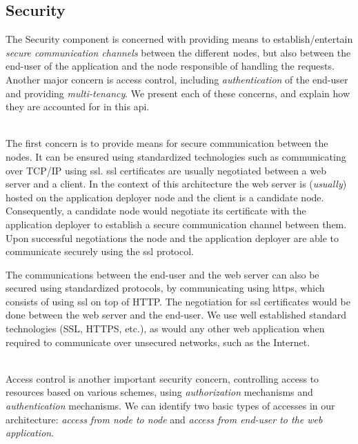 \documentclass[12pt, titlepage]{uo_temp}
\begin{document}
     \subsection{Security}
     The Security component is concerned with providing means to establish/entertain
     \emph{secure communication channels} between the different nodes, but also between
     the end-user of the application and the node responsible of handling the
     requests. Another major concern is access control, including \emph{authentication} of
     the end-user and providing \emph{multi-tenancy}. We present each of these concerns,
     and explain how they are accounted for in this \gls{api}.
     
     \\ The first concern is to provide means for secure communication between the
     nodes. It can be ensured using standardized technologies such as communicating over
     TCP/IP using \gls{ssl}. \gls{ssl} certificates are usually negotiated between a web
     server and a client. In the context of this architecture the web server is
     (\emph{usually}) hosted on the application deployer node and the client is a
     candidate node. Consequently, a candidate node would negotiate its certificate with
     the application deployer to establish a secure communication channel between
     them. Upon successful negotiations the node and the application deployer are able
     to communicate securely using the \gls{ssl} protocol.

     The communications between the end-user and the web server can also be secured using
     standardized protocols, by communicating using \gls{https}, which consists of using
     \gls{ssl} on top of HTTP. The negotiation for \gls{ssl} certificates would be done
     between the web server and the end-user. We use well established standard
     technologies (SSL, HTTPS, etc.), as would any other web application when
     required to communicate over unsecured networks, such as the Internet.

     \\ Access control is another important security concern, controlling access to
     resources based on various schemes, using \emph{authorization} mechanisms and
     \emph{authentication} mechanisms. We can identify two basic types of accesses in our
     architecture: \emph{access from node to node} and \emph{access from end-user to the
       web application}.
\end{document}
